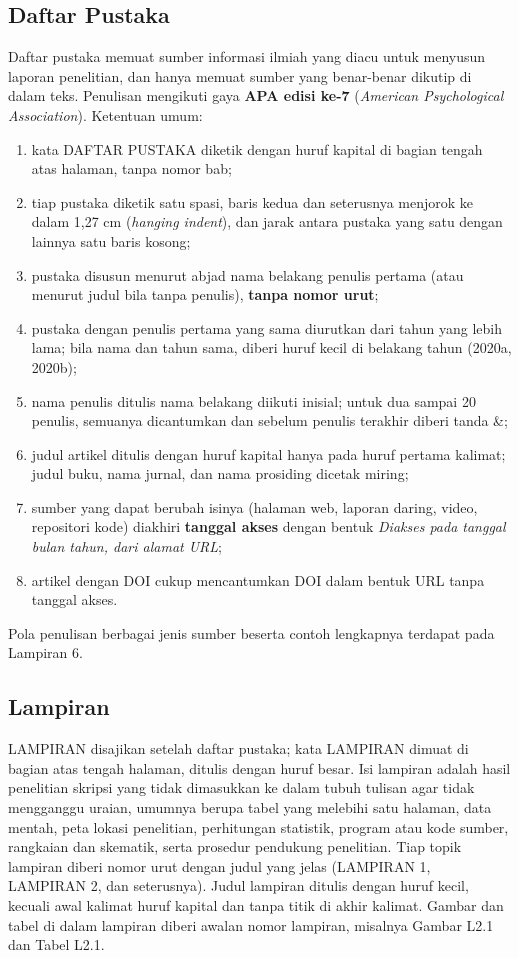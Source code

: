 \subsection{Daftar Pustaka}
Daftar pustaka memuat sumber informasi ilmiah yang diacu untuk menyusun laporan penelitian, dan hanya memuat sumber yang benar-benar dikutip di dalam teks. Penulisan mengikuti gaya \textbf{APA edisi ke-7} (\textit{American Psychological Association}). Ketentuan umum:
\begin{enumerate}
\item kata DAFTAR PUSTAKA diketik dengan huruf kapital di bagian tengah atas halaman, tanpa nomor bab;
\item tiap pustaka diketik satu spasi, baris kedua dan seterusnya menjorok ke dalam 1,27 cm (\textit{hanging indent}), dan jarak antara pustaka yang satu dengan lainnya satu baris kosong;
\item pustaka disusun menurut abjad nama belakang penulis pertama (atau menurut judul bila tanpa penulis), \textbf{tanpa nomor urut};
\item pustaka dengan penulis pertama yang sama diurutkan dari tahun yang lebih lama; bila nama dan tahun sama, diberi huruf kecil di belakang tahun (2020a, 2020b);
\item nama penulis ditulis nama belakang diikuti inisial; untuk dua sampai 20 penulis, semuanya dicantumkan dan sebelum penulis terakhir diberi tanda \&;
\item judul artikel ditulis dengan huruf kapital hanya pada huruf pertama kalimat; judul buku, nama jurnal, dan nama prosiding dicetak miring;
\item sumber yang dapat berubah isinya (halaman web, laporan daring, video, repositori kode) diakhiri \textbf{tanggal akses} dengan bentuk \textit{Diakses pada tanggal bulan tahun, dari alamat URL};
\item artikel dengan DOI cukup mencantumkan DOI dalam bentuk URL tanpa tanggal akses.
\end{enumerate}

Pola penulisan berbagai jenis sumber beserta contoh lengkapnya terdapat pada Lampiran 6.

\subsection{Lampiran}
LAMPIRAN disajikan setelah daftar pustaka; kata LAMPIRAN dimuat di bagian atas tengah halaman, ditulis dengan huruf besar. Isi lampiran adalah hasil penelitian skripsi yang tidak dimasukkan ke dalam tubuh tulisan agar tidak mengganggu uraian, umumnya berupa tabel yang melebihi satu halaman, data mentah, peta lokasi penelitian, perhitungan statistik, program atau kode sumber, rangkaian dan skematik, serta prosedur pendukung penelitian. Tiap topik lampiran diberi nomor urut dengan judul yang jelas (LAMPIRAN 1, LAMPIRAN 2, dan seterusnya). Judul lampiran ditulis dengan huruf kecil, kecuali awal kalimat huruf kapital dan tanpa titik di akhir kalimat. Gambar dan tabel di dalam lampiran diberi awalan nomor lampiran, misalnya Gambar L2.1 dan Tabel L2.1.
